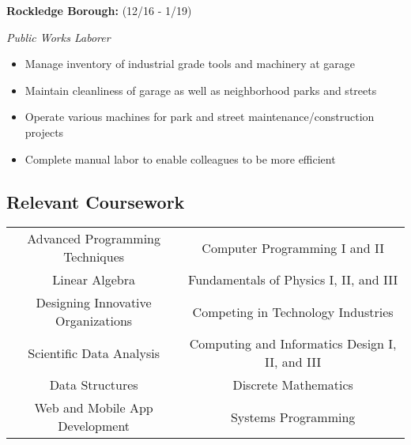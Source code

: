 \documentclass[10pt]{article}
\begin{document}
\begin{multicols}{2}
\textbf{Rockledge Borough:} (12/16 - 1/19)

\emph{Public Works Laborer}

\begin{itemize}
\setlength\itemsep{0.5em}
\item Manage inventory of industrial grade tools and machinery
at garage
\item Maintain cleanliness of garage as well as neighborhood
parks and streets
\item Operate various machines for park and street
	maintenance/construction projects
\item Complete manual labor to enable colleagues to be more
efficient
\end{itemize}

\end{multicols}

\subsection*{Relevant Coursework}%
\label{sub:Relevant Coursework}

\null

\begin{center}
\begin{tabular}{cc}
	\hline
	Advanced Programming Techniques & Computer Programming I and II \\
	Linear Algebra & Fundamentals of Physics I, II, and III \\
	Designing Innovative Organizations & Competing in Technology Industries \\
	Scientific Data Analysis & Computing and Informatics Design I, II, and III \\
	Data Structures & Discrete Mathematics \\
	Web and Mobile App Development & Systems Programming  \\
	\hline
\end{tabular}
\end{center}
\end{document}
